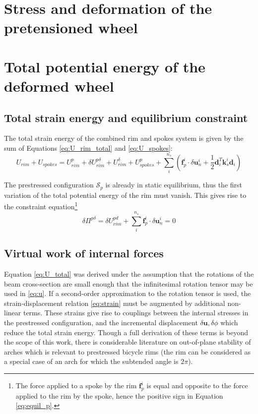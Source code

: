 \documentclass[\rootdir/thesis.tex]{subfiles}
\begin{document}
\section{Stress and deformation of the pretensioned wheel}
\label{sec:radial_bulging}



\section{Total potential energy of the deformed wheel}

\subsection{Total strain energy and equilibrium constraint}

The total strain energy of the combined rim and spokes system is given by the sum of Equations \eqref{eq:U_rim_total} and \eqref{eq:U_spokes}:
\begin{equation}
\label{eq:U_total}
U_{rim} + U_{spokes} = U_{rim}^p + \delta U_{rim}^{p\delta} + U_{rim}^{\delta} + 
	U_{spokes}^p + \sum_i^{n_s} \left(\mathbf{f}_p^i \cdot \delta\mathbf{u}_n^i +
    \frac{1}{2}\mathbf{d}_i^T \mathbf{k}_s^i \mathbf{d}_i\right)
\end{equation}

The prestressed configuration $\mathcal{S}_p$ is already in static equilibrium, thus the first variation of the total potential energy of the rim must vanish. This gives rise to the constraint equation\footnote{The force applied to a spoke by the rim $\mathbf{f}_p^i$ is equal and opposite to the force applied to the rim by the spoke, hence the positive sign in Equation \eqref{eq:equil_p}.}
\begin{equation}
\label{eq:equil_p}
\delta\Pi^{p\delta} = \delta U_{rim}^{pd} + \sum_i^{n_s} \mathbf{f}_p^i \cdot \delta\mathbf{u}_n^i = 0
\end{equation}


\subsection{Virtual work of internal forces}

Equation \eqref{eq:U_total} was derived under the assumption that the rotations of the beam cross-section are small enough that the infinitesimal rotation tensor may be used in \eqref{eq:u}. If a second-order approximation to the rotation tensor is used, the strain-displacement relation \eqref{eq:strain} must be augmented by additional non-linear terms. These strains give rise to couplings between the internal stresses in the prestressed configuration, and the incremental displacement $\delta\mathbf{u}, \delta\phi$ which reduce the total strain energy. Though a full derivation of these terms is beyond the scope of this work, there is considerable literature on out-of-plane stability of arches which is relevant to prestressed bicycle rims (the rim can be considered as a special case of an arch for which the subtended angle is $2\pi$).
\end{document}
